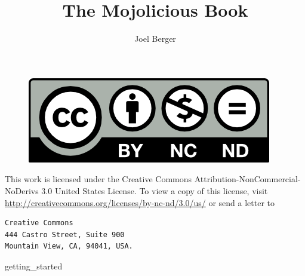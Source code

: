 \documentclass{book}
\title{The Mojolicious Book}
\author{Joel Berger}
\begin{document}
\maketitle

\newpage
\begin{figure}
  \centering
  \includegraphics{by-nc-nd}
\end{figure}
This work is licensed under the Creative Commons Attribution-NonCommercial-NoDerivs 3.0 United States License.
To view a copy of this license, visit \url{http://creativecommons.org/licenses/by-nc-nd/3.0/us/} or send a letter to
\begin{verbatim}
Creative Commons
444 Castro Street, Suite 900
Mountain View, CA, 94041, USA.
\end{verbatim}

\tableofcontents

{getting_started}
\end{document}
